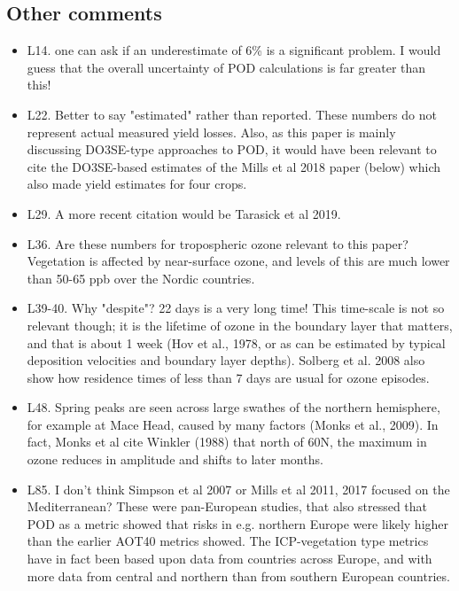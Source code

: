 \documentclass{scrartcl}
\begin{document}
\subsection*{Other comments} 
\begin{itemize}

\item {\color{blue}L14. one can ask if an underestimate of 6\% is a significant problem. I would guess that the overall uncertainty of POD calculations is far greater than this!}

\item {\color{blue}L22. Better to say "estimated" rather than reported. These numbers do not represent actual measured yield losses. Also, as this paper is mainly discussing DO3SE-type approaches to POD, it would have been relevant to cite the DO3SE-based estimates of the Mills et al 2018 paper (below) which also made yield estimates for four crops.}

\item {\color{blue}L29. A more recent citation would be Tarasick et al 2019.}

\item {\color{blue}L36. Are these numbers for tropospheric ozone relevant to this paper? Vegetation is affected by near-surface ozone, and levels of this are much lower than 50-65 ppb over the Nordic countries.}

\item {\color{blue}L39-40. Why "despite"? 22 days is a very long time! This time-scale is not so relevant though; it is the lifetime of ozone in the boundary layer that matters, and that is about 1 week (Hov et al., 1978, or as can be estimated by typical deposition velocities and boundary layer depths). Solberg et al. 2008 also show how residence times of less than 7 days are usual for ozone episodes.}

\item {\color{blue}L48. Spring peaks are seen across large swathes of the northern hemisphere, for example at Mace Head, caused by many factors (Monks et al., 2009). In fact, Monks et al cite Winkler (1988) that north of 60N, the maximum in ozone reduces in amplitude and shifts to later months.}

\item {\color{blue}L85. I don't think Simpson et al 2007 or Mills et al 2011, 2017 focused on the Mediterranean? These were pan-European studies, that also stressed that POD as a metric showed that risks in e.g. northern Europe were likely higher than the earlier AOT40 metrics showed. The ICP-vegetation type metrics have in fact been based upon data from countries across Europe, and with more data from central and northern than from southern European countries.}


\end{itemize}
\end{document}
